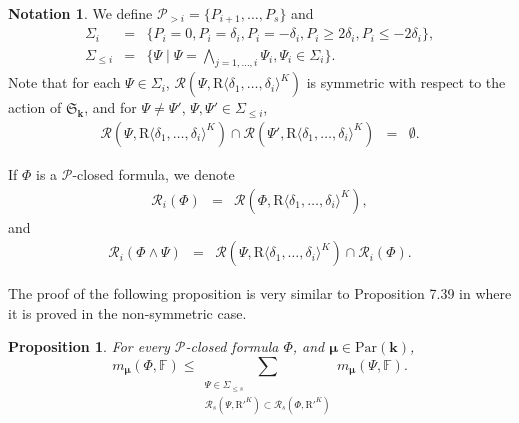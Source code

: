 \documentclass{amsart}
\newtheorem{proposition}{Proposition}
\theoremstyle{definition}
\newtheorem{notation}{Notation}
\theoremstyle{remark}
\numberwithin{equation}{section}
\begin{document}
\begin{notation}
  We define $\mathcal{P}_{>i} = \{P_{i+1} , \ldots ,P_{s} \}$ and
  \begin{eqnarray*}
    \Sigma_{i} & = & \{P_{i} =0,P_{i} = \delta_{i} ,P_{i} = - \delta_{i}
    ,P_{i} \geq 2 \delta_{i} ,P_{i} \leq -2 \delta_{i} \} ,\\
    \Sigma_{\le i} & = & \{\Psi \mid \Psi = \bigwedge_{j=1, \ldots ,i}
    \Psi_{i} , \Psi_{i} \in \Sigma_{i} \} .
  \end{eqnarray*}
  Note that for each $\Psi \in \Sigma_{i}$, ${{\mathcal R}}(\Psi , {\mathrm{R}} \langle
  \delta_{1} , \ldots , \delta_{i} \rangle^{K})$ is symmetric with respect
  to the action of $\mathfrak{S}_{\mathbf{k}}$,  and for
  $\Psi \neq \Psi'$, $\Psi , \Psi' \in \Sigma_{\leq i}$,
  \begin{eqnarray}
    {{\mathcal R}} \left(\Psi , {\mathrm{R}} \langle \delta_{1} , \ldots , \delta_{i} {{\rangle}}^{K} \right)
    \cap {{\mathcal R}} \left(\Psi' , {\mathrm{R}} {{\langle}} \delta_{1} , \ldots , \delta_{i} {{\rangle}}^{K}
    \right) & = & \emptyset .  \label{eqn:disjoint}
  \end{eqnarray}
  
  
  If $\Phi$ is a $\mathcal{P}$-closed formula, we denote
  \begin{eqnarray*}
    {{\mathcal R}}_{i} (\Phi) & = & {{\mathcal R}}(\Phi , {\mathrm{R}} {{\langle}} \delta_{1} , \ldots ,\delta_{i} {{\rangle}}^{K}) ,
  \end{eqnarray*}
  and
  \begin{eqnarray*}
    {{\mathcal R}}_{i} (\Phi \wedge \Psi) & = & {{\mathcal R}}(\Psi , {\mathrm{R}} {{\langle}} \delta_{1} ,
    \ldots , \delta_{i} {{\rangle}}^{K}) \cap {{\mathcal R}}_{i} (\Phi) .
  \end{eqnarray*}
\end{notation}

The proof of the following proposition is very similar to Proposition 7.39 in
{\cite{BPRbook2}} where it is proved in the non-symmetric case.

\begin{proposition}
  \label{7:prop:closed-with-parameters}
  For every $\mathcal{P}$-closed formula
  $\Phi$, and $\pmb{\mu} \in {\mathrm{Par}}({\mathbf{k}})$,
  \[  m_{\pmb{\mu}}(\Phi,{\mathbb{F}}) \leq
     \sum_{\substack{
       \Psi \in \Sigma_{\le s}\\
       {{\mathcal R}}_{s} (\Psi , {\mathrm{R}}'^{K}) \subset {{\mathcal R}}_{s} (\Phi , {\mathrm{R}}'^{K})
       }}
      m_{\pmb{\mu}}(\Psi,{\mathbb{F}}) . 
     \]
\end{proposition}
\end{document}
